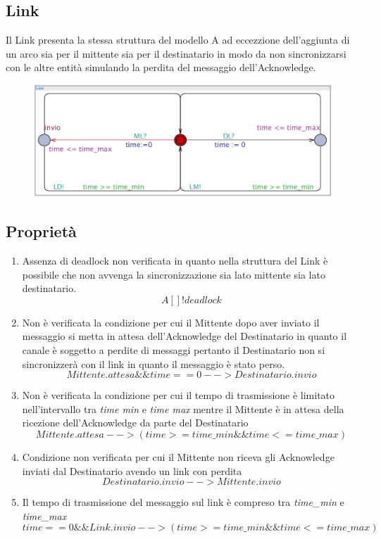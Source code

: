 \documentclass{article}
\begin{document}
\subsection{Link}
Il Link presenta la stessa struttura del modello A ad eccezzione dell'aggiunta di un arco sia per il mittente sia per il destinatario in modo da non sincronizzarsi con le altre entità simulando la perdita del messaggio dell'Acknowledge.
\begin{figure}[h] 
\centering
\includegraphics[scale=0.4]{modelloBL.png}
\end{figure}
\subsection{Proprietà}
\begin{enumerate}
    \item Assenza di deadlock non verificata in quanto nella struttura del Link è possibile che non avvenga la sincronizzazione sia lato mittente sia lato destinatario.
    \begin{equation}
    A[ ] !deadlock 
    \end{equation}
\item Non è verificata la condizione per cui il Mittente dopo aver inviato il messaggio si metta in attesa dell'Acknowledge del Destinatario in quanto il canale è soggetto a perdite di messaggi pertanto il Destinatario non si sincronizzerà con il link in quanto il messaggio è stato perso.
\begin{equation}
Mittente.attesa \&\& time == 0 --> Destinatario.invio
\end{equation}
\item Non è verificata la condizione per cui il tempo di trasmissione è limitato nell'intervallo tra \textit{time min} e \textit{time max} mentre il Mittente è in attesa della ricezione dell'Acknowledge da parte del Destinatario
\begin{equation}
    Mittente.attesa --> (time >= time\_min  \&\& time <= time\_max)
\end{equation}
\item  Condizione non verificata per cui il Mittente non riceva gli Acknowledge inviati dal Destinatario avendo un link con perdita
\begin{equation}
Destinatario.invio --> Mittente.invio 
\end{equation}
 \item Il tempo di trasmissione del messaggio sul link è compreso tra \textit{time\_min} e \textit{time\_max}
\begin{equation}
    time == 0 \&\& Link.invio --> (time >= time\_min \&\& time <= time\_max)
\end{equation}
    
\end{enumerate}
\clearpage
\end{document}
